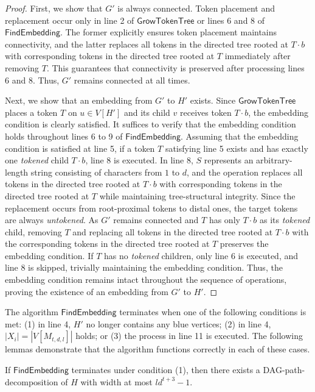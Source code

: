 \documentclass[runningheads]{llncs}
\theoremstyle{plain}
\theoremstyle{definition}
\begin{document}
\begin{proof}
    First, we show that $G'$ is always connected. Token placement and replacement occur only in line 2 of $\mathsf{GrowTokenTree}$ or lines 6 and 8 of $\mathsf{FindEmbedding}$. The former explicitly ensures token placement maintains connectivity, and the latter replaces all tokens in the directed tree rooted at $T \cdot b$ with corresponding tokens in the directed tree rooted at $T$ immediately after removing $T$. This guarantees that connectivity is preserved after processing lines 6 and 8. Thus, $G'$ remains connected at all times.

    Next, we show that an embedding from $G'$ to $H'$ exists. Since $\mathsf{GrowTokenTree}$ places a token $T$ on $u \in V[H']$ and its child $v$ receives token $T \cdot b$, the embedding condition is clearly satisfied. It suffices to verify that the embedding condition holds throughout lines 6 to 9 of $\mathsf{FindEmbedding}$. Assuming that the embedding condition is satisfied at line 5, if a token $T$ satisfying line 5 exists and has exactly one \textit{tokened} child $T \cdot b$, line 8 is executed. In line 8, $S$ represents an arbitrary-length string consisting of characters from $1$ to $d$, and the operation replaces all tokens in the directed tree rooted at $T \cdot b$ with corresponding tokens in the directed tree rooted at $T$ while maintaining tree-structural integrity. Since the replacement occurs from root-proximal tokens to distal ones, the target tokens are always \textit{untokened}. As $G'$ remains connected and $T$ has only $T \cdot b$ as its \textit{tokened} child, removing $T$ and replacing all tokens in the directed tree rooted at $T \cdot b$ with the corresponding tokens in the directed tree rooted at $T$ preserves the embedding condition. If $T$ has no \textit{tokened} children, only line 6 is executed, and line 8 is skipped, trivially maintaining the embedding condition. Thus, the embedding condition remains intact throughout the sequence of operations, proving the existence of an embedding from $G'$ to $H'$.
\end{proof}


The algorithm $\mathsf{FindEmbedding}$ terminates when one of the following conditions is met: (1) in line 4, $H'$ no longer contains any blue vertices; (2) in line 4, $|X_i| = |V[M_{t, d, l}]|$ holds; or (3) the process in line 11 is executed. The following lemmas demonstrate that the algorithm functions correctly in each of these cases.

\begin{lemma}\label{lemma_(1)}
    If $\mathsf{FindEmbedding}$ terminates under condition (1), then there exists a DAG-path-decomposition of $H$ with width at most $ld^{t+3}-1$.
\end{lemma}
\end{document}
